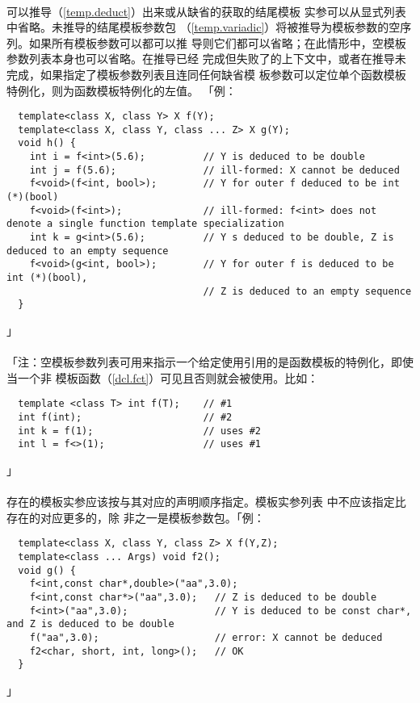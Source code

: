 \paragraph{}
可以推导（\ref{temp.deduct}）出来或从缺省的获取的结尾模板
实参可以从显式列表中省略。未推导的结尾模板参数包
（\ref{temp.variadic}）将被推导为模板参数的空序列。如果所有模板参数可以都可以推
导则它们都可以省略；在此情形中，空模板参数列表\tm{<>}本身也可以省略。在推导已经
完成但失败了的上下文中，或者在推导未完成，如果指定了模板参数列表且连同任何缺省模
板参数可以定位单个函数模板特例化，则为函数模板特例化的左值。
「例：
\begin{lstlisting}
  template<class X, class Y> X f(Y);
  template<class X, class Y, class ... Z> X g(Y);
  void h() {
    int i = f<int>(5.6);          // Y is deduced to be double
    int j = f(5.6);               // ill-formed: X cannot be deduced
    f<void>(f<int, bool>);        // Y for outer f deduced to be int (*)(bool)
    f<void>(f<int>);              // ill-formed: f<int> does not denote a single function template specialization
    int k = g<int>(5.6);          // Y s deduced to be double, Z is deduced to an empty sequence
    f<void>(g<int, bool>);        // Y for outer f is deduced to be int (*)(bool),
                                  // Z is deduced to an empty sequence
  }
\end{lstlisting}」

\paragraph{}
「注：空模板参数列表可用来指示一个给定使用引用的是函数模板的特例化，即使当一个非
模板函数（\ref{dcl.fct}）可见且否则就会被使用。比如：
\begin{lstlisting}
  template <class T> int f(T);    // #1
  int f(int);                     // #2
  int k = f(1);                   // uses #2
  int l = f<>(1);                 // uses #1
\end{lstlisting}」

\paragraph{}
存在的模板实参应该按与其对应的声明顺序指定。模板实参列表
中不应该指定比存在的对应更多的，除
非之一是模板参数包。「例：
\begin{lstlisting}
  template<class X, class Y, class Z> X f(Y,Z);
  template<class ... Args) void f2();
  void g() {
    f<int,const char*,double>("aa",3.0);
    f<int,const char*>("aa",3.0);   // Z is deduced to be double
    f<int>("aa",3.0);               // Y is deduced to be const char*, and Z is deduced to be double
    f("aa",3.0);                    // error: X cannot be deduced
    f2<char, short, int, long>();   // OK
  }
\end{lstlisting}」

